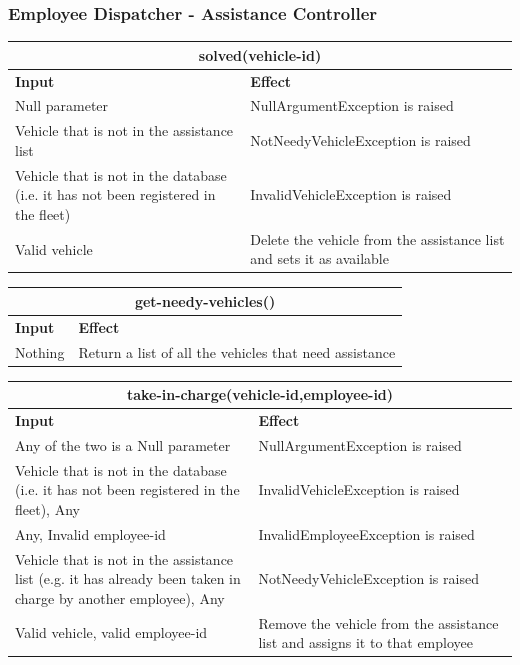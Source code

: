 \documentclass{article}
\begin{document}
\subsubsection{Employee Dispatcher - Assistance Controller}
\begin{tabular}{ |p{5cm}|p{7cm}| }
  \hline
  \multicolumn{2}{|c|}{solved(vehicle-id)} \\
  \hline
  \textbf{Input} & \textbf{Effect} \\
  \hline
  Null parameter & NullArgumentException is raised\\
  \hline
  Vehicle that is not in the assistance list & NotNeedyVehicleException is raised\\
  \hline
  Vehicle that is not in the database (i.e. it has not been registered in the fleet) & InvalidVehicleException is raised\\
  \hline
  Valid vehicle & Delete the vehicle from the assistance list and sets it as available\\
  \hline
\end{tabular}
\newline
\begin{tabular}{ |p{5cm}|p{7cm}| }
  \hline
  \multicolumn{2}{|c|}{get-needy-vehicles()} \\
  \hline
  \textbf{Input} & \textbf{Effect} \\
  \hline
  Nothing & Return a list of all the vehicles that need assistance\\
  \hline
\end{tabular}
\newline
\begin{tabular}{ |p{5cm}|p{7cm}| }
  \hline
  \multicolumn{2}{|c|}{take-in-charge(vehicle-id,employee-id)} \\
  \hline
  \textbf{Input} & \textbf{Effect} \\
  \hline
  Any of the two is a Null parameter & NullArgumentException is raised\\
  \hline
 Vehicle that is not in the database (i.e. it has not been registered in the fleet), Any & InvalidVehicleException is raised\\
  \hline
  Any, Invalid employee-id & InvalidEmployeeException is raised\\
  \hline
  Vehicle that is not in the assistance list (e.g. it has already been taken in charge by another employee), Any & NotNeedyVehicleException is raised\\
  \hline
  Valid vehicle, valid employee-id & Remove the vehicle from the assistance list and assigns it to that employee\\
  \hline
\end{tabular}
\end{document}
